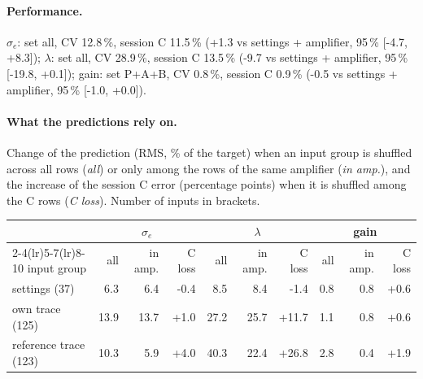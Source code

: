 \paragraph{Performance.}
$\sigma_e$: set all, CV 12.8\,\%, session C 11.5\,\% (+1.3 vs settings + amplifier, 95\,\% [-4.7, +8.3]); $\lambda$: set all, CV 28.9\,\%, session C 13.5\,\% (-9.7 vs settings + amplifier, 95\,\% [-19.8, +0.1]); gain: set P+A+B, CV 0.8\,\%, session C 0.9\,\% (-0.5 vs settings + amplifier, 95\,\% [-1.0, +0.0]).
\paragraph{What the predictions rely on.} Change of the prediction (RMS, \% of the target) when an input group is shuffled across all rows (\emph{all}) or only among the rows of the same amplifier (\emph{in amp.}), and the increase of the session C error (percentage points) when it is shuffled among the C rows (\emph{C loss}). Number of inputs in brackets.
\begin{center}\footnotesize
\begin{tabular}{lrrrrrrrrr}
\toprule
 & \multicolumn{3}{c}{$\sigma_e$} & \multicolumn{3}{c}{$\lambda$} & \multicolumn{3}{c}{gain} \\
\cmidrule(lr){2-4}\cmidrule(lr){5-7}\cmidrule(lr){8-10}
input group & all & in amp. & C loss & all & in amp. & C loss & all & in amp. & C loss \\
\midrule
settings (37) & 6.3 & 6.4 & -0.4 & 8.5 & 8.4 & -1.4 & 0.8 & 0.8 & +0.6 \\
own trace (125) & 13.9 & 13.7 & +1.0 & 27.2 & 25.7 & +11.7 & 1.1 & 0.8 & +0.6 \\
reference trace (123) & 10.3 & 5.9 & +4.0 & 40.3 & 22.4 & +26.8 & 2.8 & 0.4 & +1.9 \\
\bottomrule
\end{tabular}
\end{center}
